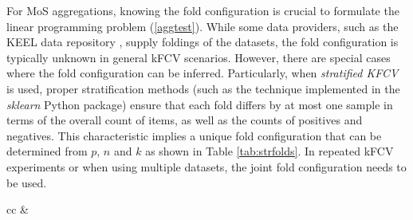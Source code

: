 \documentclass[3p, times]{elsarticle}
\begin{document}
For MoS aggregations, knowing the fold configuration is crucial to formulate the linear programming problem (\ref{aggtest}). While some data providers, such as the KEEL data repository \cite{keel}, supply foldings of the datasets, the fold configuration is typically unknown in general kFCV scenarios. However, there are special cases where the fold configuration can be inferred. Particularly, when \emph{stratified KFCV} is used, proper stratification methods (such as the technique implemented in the \emph{sklearn} \cite{sklearn} Python package) ensure that each fold differs by at most one sample in terms of the overall count of items, as well as the counts of positives and negatives. This characteristic implies a unique fold configuration that can be determined from $p$, $n$ and $k$ as shown in Table \ref{tab:strfolds}. In repeated kFCV experiments or when using multiple datasets, the joint fold configuration needs to be used.

\begin{table}
    \caption{Fold configurations by the stratified kFCV implemented in \emph{sklearn}, with $p_{mod} = p \mod k$, $p_{div} = \lfloor p/k\rfloor$, $n_{mod} = n \mod k$, $n_{div} = \lfloor n/k\rfloor$. The \emph{count of folds} column indicates how many times folds with $p_i$ and $n_i$ counts appear in the configuration, when $p_{mod} + n_{mod} > k$ (a) and $p_{mod} + n_{mod} \leq k$ (b).}
    \label{tab:strfolds}
\begin{center}
\begin{small}
 \begin{tabular}{cc}   
    &
\end{tabular}
 \end{small}
 \end{center}
\end{table}
\end{document}
